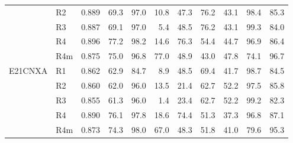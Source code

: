 \begin{table}[h]
\begin{tabular}{@{}llrrrrrrrrr@{}}
 & R2 & 0.889 & 69.3 & 97.0 & 10.8 & 47.3 & 76.2 & 43.1 & 98.4 & 85.3 \\
 & R3 & 0.887 & 69.1 & 97.0 & 5.4 & 48.5 & 76.2 & 43.1 & 99.3 & 84.0 \\
 & R4 & 0.896 & 77.2 & 98.2 & 14.6 & 76.3 & 54.4 & 44.7 & 96.9 & 86.4 \\
 & R4m & 0.875 & 75.0 & 96.8 & 77.0 & 48.9 & 43.0 & 47.8 & 74.1 & 96.7 \\
\addlinespace
E21CNXA & R1 & 0.862 & 62.9 & 84.7 & 8.9 & 48.5 & 69.4 & 41.7 & 98.7 & 84.5 \\
 & R2 & 0.860 & 62.0 & 96.0 & 13.5 & 21.4 & 62.7 & 52.2 & 97.5 & 85.8 \\
 & R3 & 0.855 & 61.3 & 96.0 & 1.4 & 23.4 & 62.7 & 52.2 & 99.2 & 82.3 \\
 & R4 & 0.890 & 76.1 & 97.8 & 18.6 & 74.4 & 51.3 & 37.3 & 96.8 & 87.1 \\
 & R4m & 0.873 & 74.3 & 98.0 & 67.0 & 48.3 & 51.8 & 41.0 & 79.6 & 95.3 \\
\bottomrule
\end{tabular}
\end{table}
